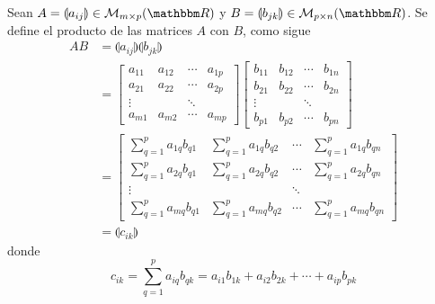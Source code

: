\begin{definition}\label{matrixprod}
    Sean $A = \llparenthesis a_{ij} \rrparenthesis \in \mathcal{M}_{m \times p}(\RR)$ y $B = \llparenthesis b_{jk} \rrparenthesis \in \mathcal{M}_{p \times n}(\RR)$. Se define el producto de las matrices $A$ con $B$, como sigue
    \begin{align*}
        AB & = \llparenthesis a_{ij} \rrparenthesis \llparenthesis b_{jk} \rrparenthesis \\
        & = \begin{bmatrix}
            a_{11} & a_{12} & \cdots & a_{1p}\\
            a_{21} & a_{22} & \cdots & a_{2p}\\
            \vdots &  & \ddots & \\
            a_{m1} & a_{m2} & \cdots & a_{mp}
        \end{bmatrix} \begin{bmatrix}
            b_{11} & b_{12} & \cdots & b_{1n}\\
            b_{21} & b_{22} & \cdots & b_{2n}\\
            \vdots &  & \ddots & \\
            b_{p1} & b_{p2} & \cdots & b_{pn}
        \end{bmatrix} \\
        & = \begin{bmatrix}
            \displaystyle\sum_{q=1}^{p} a_{1q}b_{q1} & \displaystyle\sum_{q=1}^{p} a_{1q}b_{q2} & \cdots & \displaystyle\sum_{q=1}^{p} a_{1q}b_{qn} \\
            \displaystyle\sum_{q=1}^{p} a_{2q}b_{q1} & \displaystyle\sum_{q=1}^{p} a_{2q}b_{q2} & \cdots & \displaystyle\sum_{q=1}^{p} a_{2q}b_{qn} \\
            \vdots & & \ddots & \\
            \displaystyle\sum_{q=1}^{p} a_{mq}b_{q1} & \displaystyle\sum_{q=1}^{p} a_{mq}b_{q2} & \cdots & \displaystyle\sum_{q=1}^{p} a_{mq}b_{qn}
        \end{bmatrix} \\
        & = \llparenthesis c_{ik} \rrparenthesis
    \end{align*}
    donde
    \begin{equation}
        c_{ik} = \sum_{q=1}^{p} a_{iq}b_{qk} = a_{i1}b_{1k} + a_{i2}b_{2k} + \cdots + a_{ip}b_{pk} \label{eqcusjahha}
    \end{equation}
\end{definition}

